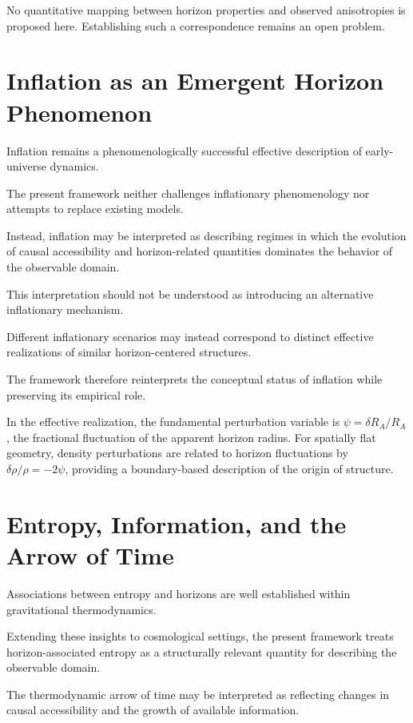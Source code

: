 \documentclass[12pt,a4paper]{article}
\begin{document}
No quantitative mapping between horizon properties and observed anisotropies is proposed here. Establishing such a correspondence remains an open problem.

\section{Inflation as an Emergent Horizon Phenomenon}

Inflation remains a phenomenologically successful effective description of early-universe dynamics.

The present framework neither challenges inflationary phenomenology nor attempts to replace existing models.

Instead, inflation may be interpreted as describing regimes in which the evolution of causal accessibility and horizon-related quantities dominates the behavior of the observable domain.

This interpretation should not be understood as introducing an alternative inflationary mechanism.

Different inflationary scenarios may instead correspond to distinct effective realizations of similar horizon-centered structures.

The framework therefore reinterprets the conceptual status of inflation while preserving its empirical role.

In the effective realization, the fundamental perturbation variable is $\psi = \delta R_A / R_A$, the fractional fluctuation of the apparent horizon radius. For spatially flat geometry, density perturbations are related to horizon fluctuations by $\delta\rho/\rho = -2\psi$, providing a boundary-based description of the origin of structure.

\section{Entropy, Information, and the Arrow of Time}

Associations between entropy and horizons are well established within gravitational thermodynamics.

Extending these insights to cosmological settings, the present framework treats horizon-associated entropy as a structurally relevant quantity for describing the observable domain.

The thermodynamic arrow of time may be interpreted as reflecting changes in causal accessibility and the growth of available information.
\end{document}
